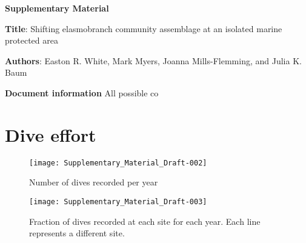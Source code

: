 \documentclass[a4paper]{article}
\begin{document}
\begin{center}
\textbf{Supplementary Material}
\bigskip
\end{center}

\textbf{Title}: Shifting elasmobranch community assemblage at an isolated marine protected area
\bigskip

\textbf{Authors}: Easton R. White, Mark Myers, Joanna Mills-Flemming, and Julia K. Baum
\bigskip

\textbf{Document information}
All possible co
\pagebreak



\pagebreak




\section{Dive effort}



\begin{figure}[h!]
\texttt{[image: Supplementary\_Material\_Draft-002]}
\caption{Number of dives recorded per year}
\end{figure}


\begin{figure}[h!]
\texttt{[image: Supplementary\_Material\_Draft-003]}
\caption{Fraction of dives recorded at each site for each year. Each line represents a different site. }
\end{figure}

\end{document}
